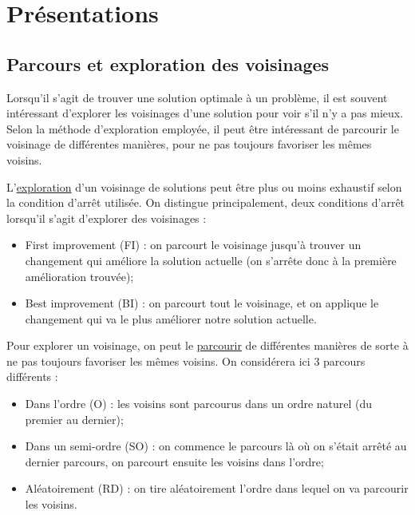 \documentclass[a4paper,11pt]{article}%
\begin{document}
\section{Présentations}

\subsection{Parcours et exploration des voisinages}
\label{voisinage}

Lorsqu'il s'agit de trouver une solution optimale à un problème, il est souvent intéressant d'explorer les voisinages d'une solution pour voir s'il n'y a pas mieux. Selon la méthode d'exploration employée, il peut être intéressant de parcourir le voisinage de différentes manières, pour ne pas toujours favoriser les mêmes voisins.

L'\underline{exploration} d'un voisinage de solutions peut être plus ou moins exhaustif selon la condition d'arrêt utilisée.
On distingue principalement, deux conditions d'arrêt lorsqu'il s'agit d'explorer des voisinages :

\begin{itemize}
\item First improvement (FI) : on parcourt le voisinage jusqu'à trouver un changement qui améliore la solution actuelle (on s'arrête donc à la première amélioration trouvée);
\item Best improvement (BI) : on parcourt tout le voisinage, et on applique le changement qui va le plus améliorer notre solution actuelle. \\
\end{itemize}

Pour explorer un voisinage, on peut le \underline{parcourir} de différentes manières de sorte à ne pas toujours favoriser les mêmes voisins. On considérera ici 3 parcours différents : 

\begin{itemize}
\item Dans l'ordre (O) : les voisins sont parcourus dans un ordre naturel (du premier au dernier);
\item Dans un semi-ordre (SO) : on commence le parcours là où on s'était arrêté au dernier parcours, on parcourt ensuite les voisins dans l'ordre;
\item Aléatoirement (RD) : on tire aléatoirement l'ordre dans lequel on va parcourir les voisins. \\
\end{itemize}
\end{document}
